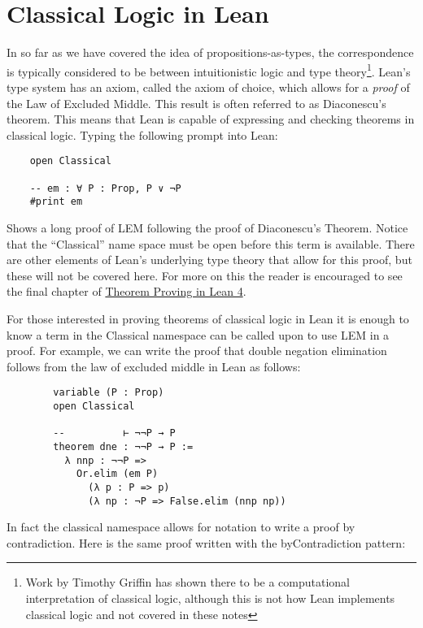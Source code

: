 \documentclass{book}
\begin{document}
    \newpage
    \section{Classical Logic in Lean}

    In so far as we have covered the idea of propositions-as-types, the correspondence is typically considered to be between intuitionistic logic and type theory\footnote{Work by Timothy Griffin has shown there to be a computational interpretation of classical logic, although this is not how Lean implements classical logic and not covered in these notes}. Lean's type system has an axiom, called the axiom of choice, which allows for a \emph{proof} of the Law of Excluded Middle. This result is often referred to as Diaconescu's theorem. This means that Lean is capable of expressing and checking theorems in classical logic. Typing the following prompt into Lean: 

    \begin{lstlisting}
    open Classical

    -- em : ∀ P : Prop, P ∨ ¬P
    #print em 
    \end{lstlisting}
    
    Shows a long proof of LEM following the proof of Diaconescu's Theorem. Notice that the ``Classical'' name space must be open before this term is available. There are other elements of Lean's underlying type theory that allow for this proof, but these will not be covered here. For more on this the reader is encouraged to see the final chapter of \href{https://lean-lang.org/theorem\_proving\_in\_lean4/axioms\_and\_computation.html}{Theorem Proving in Lean 4}.

    For those interested in proving theorems of classical logic in Lean it is enough to know a term in the Classical namespace can be called upon to use LEM in a proof. For example, we can write the proof that double negation elimination follows from the law of excluded middle in Lean as follows: 

    \begin{lstlisting}
        variable (P : Prop)
        open Classical
    
        --          ⊢ ¬¬P → P
        theorem dne : ¬¬P → P :=
          λ nnp : ¬¬P =>
            Or.elim (em P)
              (λ p : P => p)
              (λ np : ¬P => False.elim (nnp np))
    \end{lstlisting}

    In fact the classical namespace allows for notation to write a proof by contradiction. Here is the same proof written with the byContradiction pattern:
\end{document}
